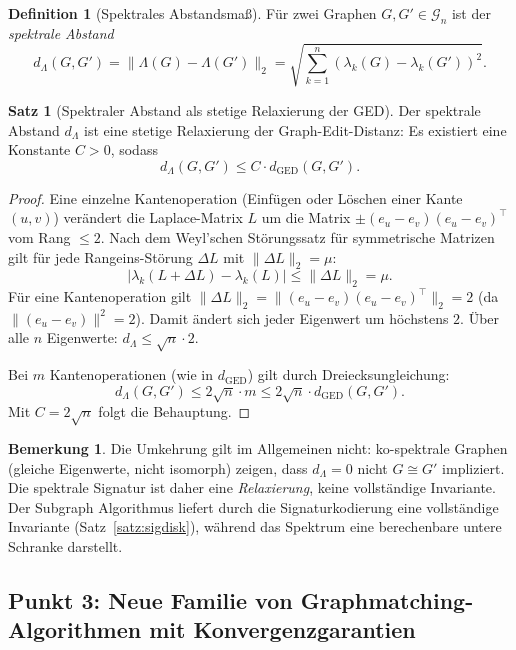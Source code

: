 ﻿\documentclass[a4paper,12pt]{article}
\theoremstyle{definition}
\newtheorem{definition}{Definition}
\newtheorem{satz}{Satz}
\newtheorem{bemerkung}{Bemerkung}
\begin{document}
\begin{definition}[Spektrales Abstandsmaß]
\label{def:specabst}
    Für zwei Graphen $G, G' \in \mathcal{G}_n$ ist der \emph{spektrale Abstand}
    \[
    d_{\Lambda}(G, G') = \|\Lambda(G) - \Lambda(G')\|_2 = \sqrt{\sum_{k=1}^n (\lambda_k(G) - \lambda_k(G'))^2}.
    \]
\end{definition}

\begin{satz}[Spektraler Abstand als stetige Relaxierung der GED]
\label{satz:spekrelax}
    Der spektrale Abstand $d_\Lambda$ ist eine stetige Relaxierung der
    Graph-Edit-Distanz: Es existiert eine Konstante $C > 0$, sodass
    \[
    d_{\Lambda}(G, G') \leq C \cdot d_{\mathrm{GED}}(G, G').
    \]
\end{satz}

\begin{proof}
    Eine einzelne Kantenoperation (Einfügen oder Löschen einer Kante $(u,v)$) verändert
    die Laplace-Matrix $L$ um die Matrix $\pm(e_u - e_v)(e_u - e_v)^\top$ vom Rang $\leq 2$.
    Nach dem Weyl'schen Störungssatz für symmetrische Matrizen gilt für jede Rangeins-Störung
    $\Delta L$ mit $\|\Delta L\|_2 = \mu$:
    \[
    |\lambda_k(L + \Delta L) - \lambda_k(L)| \leq \|\Delta L\|_2 = \mu.
    \]
    Für eine Kantenoperation gilt $\|\Delta L\|_2 = \|(e_u - e_v)(e_u - e_v)^\top\|_2 = 2$
    (da $\|(e_u-e_v)\|^2 = 2$). Damit ändert sich jeder Eigenwert um höchstens $2$.
    Über alle $n$ Eigenwerte: $d_\Lambda \leq \sqrt{n} \cdot 2$.

    Bei $m$ Kantenoperationen (wie in $d_{\mathrm{GED}}$) gilt durch Dreiecksungleichung:
    \[
    d_\Lambda(G, G') \leq 2\sqrt{n} \cdot m \leq 2\sqrt{n} \cdot d_{\mathrm{GED}}(G, G').
    \]
    Mit $C = 2\sqrt{n}$ folgt die Behauptung. \qedhere
\end{proof}

\begin{bemerkung}
    Die Umkehrung gilt im Allgemeinen nicht: ko-spektrale Graphen (gleiche Eigenwerte,
    nicht isomorph) zeigen, dass $d_\Lambda = 0$ nicht $G \cong G'$ impliziert.
    Die spektrale Signatur ist daher eine \emph{Relaxierung}, keine vollständige Invariante.
    Der Subgraph Algorithmus liefert durch die Signaturkodierung eine vollständige Invariante
    (Satz~\ref{satz:sigdisk}), während das Spektrum eine berechenbare untere Schranke darstellt.
\end{bemerkung}

\subsection{Punkt 3: Neue Familie von Graphmatching-Algorithmen mit Konvergenzgarantien}
\end{document}

